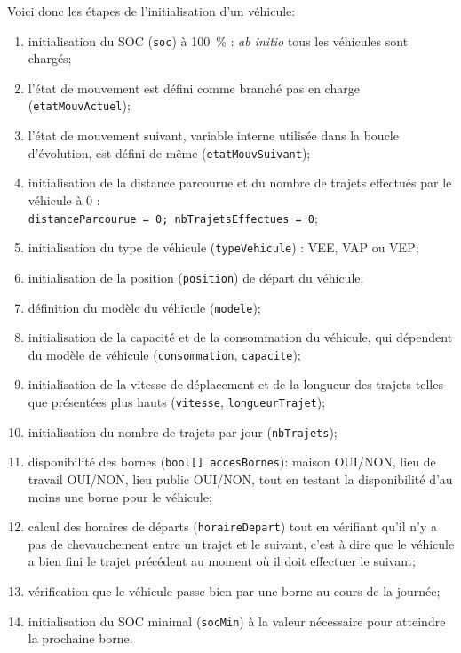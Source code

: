 			Voici donc les étapes de l'initialisation d'un véhicule:
			\begin{enumerate}
				\item initialisation du SOC (\lstinline|soc|) à \SI{100}{\percent} : \emph{ab initio} tous les véhicules sont chargés;
				\item l'état de mouvement est défini comme branché pas en charge (\lstinline|etatMouvActuel|);
				\item l'état de mouvement suivant, variable interne utilisée dans la boucle d'évolution, est défini de même (\lstinline|etatMouvSuivant|);
				\item initialisation de la distance parcourue et du nombre de trajets effectués par le véhicule à 0 :\\ \lstinline|distanceParcourue = 0; nbTrajetsEffectues = 0|;
				\item initialisation du type de véhicule (\lstinline|typeVehicule|) : VEE, VAP ou VEP;
				\item initialisation de la position (\lstinline{position}) de départ du véhicule;
				\item définition du modèle du véhicule (\lstinline{modele});
				\item initialisation de la capacité et de la consommation du véhicule, qui dépendent du modèle de véhicule (\lstinline{consommation}, \lstinline{capacite});
				\item initialisation de la vitesse de déplacement et de la longueur des trajets telles que présentées plus hauts (\lstinline{vitesse}, \lstinline{longueurTrajet});
				\item initialisation du nombre de trajets par jour (\lstinline{nbTrajets});
				\item disponibilité des bornes (\lstinline{bool[] accesBornes}): maison OUI/NON, lieu de travail OUI/NON, lieu public OUI/NON, tout en testant la disponibilité d'au moins une borne pour le véhicule;
				\item calcul des horaires de départs (\lstinline{horaireDepart}) tout en vérifiant qu'il n'y a pas de chevauchement entre un trajet et le suivant, c'est à dire que le véhicule a bien fini le trajet précédent au moment où il doit effectuer le suivant;
				\item vérification que le véhicule passe bien par une borne au cours de la journée;
				\item initialisation du SOC minimal (\lstinline{socMin}) à la valeur nécessaire pour atteindre la prochaine borne.
			\end{enumerate}	
	
